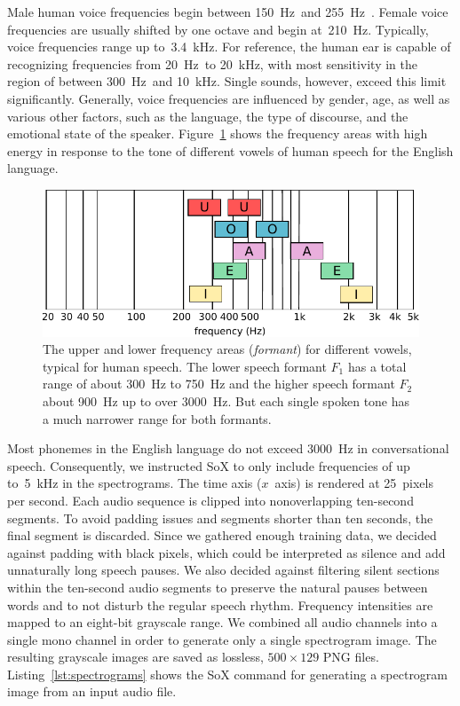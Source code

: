 	Male human voice frequencies begin between \SI{150}{\hertz}~and \SI{255}{\hertz}~\cite{traunmuller1993frequency}. Female voice frequencies are usually shifted by one octave and begin at~\SI{210}{\hertz}. Typically, voice frequencies range up to~\SI{3.4}{\kilo\hertz}. For reference, the human ear is capable of recognizing frequencies from \SI{20}{\hertz}~to \SI{20}{\kilo\hertz}, with most sensitivity in the region of between \SI{300}{\hertz}~and \SI{10}{\kilo\hertz}. Single sounds, however, exceed this limit significantly. Generally, voice frequencies are influenced by gender, age, as well as various other factors, such as the language, the type of discourse, and the emotional state of the speaker. Figure~\ref{img:frequencies} shows the frequency areas with high energy in response to the tone of different vowels of human speech for the English language.
%
	\begin{figure}[tp]
  		\centering
    	\includegraphics[width=\textwidth,keepaspectratio]{img/frequencies.pdf}
    	\caption{The upper and lower frequency areas (\emph{formant}) for different vowels, typical for human speech. The lower speech formant $F_1$ has a total range of about \SI{300}{\hertz} to \SI{750}{\hertz} and the higher speech formant $F_2$ about \SI{900}{\hertz} up to over \SI{3000}{\hertz}. But each single spoken tone has a much narrower range for both formants.}
    	\label{img:frequencies}
	\end{figure}
%

Most phonemes in the English language do not exceed \SI{3000}{\hertz} in conversational speech.
Consequently, we instructed SoX to only include frequencies of up to~\SI{5}{\kilo\hertz} in the spectrograms.
The time axis ($x$~axis) is rendered at \num{25}~pixels per second. Each audio sequence is clipped into nonoverlapping ten-second segments. To avoid padding issues and segments shorter than ten seconds, the final segment is discarded. Since we gathered enough training data, we decided against padding with black pixels, which could be interpreted as silence and add unnaturally long speech pauses. We also decided against filtering silent sections within the ten-second audio segments to preserve the natural pauses between words and to not disturb the regular speech rhythm. Frequency intensities are mapped to an eight-bit grayscale range. We combined all audio channels into a single mono channel in order to generate only a single spectrogram image. The resulting grayscale images are saved as lossless, $500 \times 129$ PNG files. Listing~\ref{lst:spectrograms} shows the SoX command for generating a spectrogram image from an input audio file.

